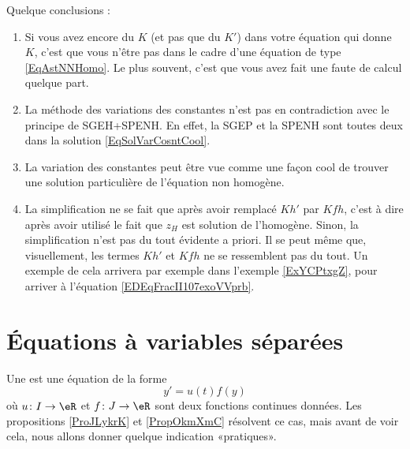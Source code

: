 Quelque conclusions :

\begin{enumerate}
\item
Si vous avez encore du $K$ (et pas que du $K'$) dans votre équation qui donne $K$, c'est que vous n'être pas dans le cadre d'une équation de type \eqref{EqAstNNHomo}. Le plus souvent, c'est que vous avez fait une faute de calcul quelque part.

\item
La méthode des variations des constantes n'est pas en contradiction avec le principe de \og SGEH+SPENH\fg. En effet, la SGEP et la SPENH sont toutes deux dans la solution \eqref{EqSolVarCosntCool}.

\item
La variation des constantes peut être vue comme une façon cool de trouver une solution particulière de l'équation non homogène.

\item
    La simplification ne se fait que après avoir remplacé $Kh'$ par $Kfh$, c'est à dire après avoir utilisé le fait que $z_H$ est solution de l'homogène. Sinon, la simplification n'est pas du tout évidente a priori. Il se peut même que, visuellement, les termes $Kh'$ et $Kfh$ ne se ressemblent pas du tout. Un exemple de cela arrivera par exemple dans l'exemple \ref{ExYCPtxgZ}, pour arriver à l'équation \eqref{EDEqFracII107exoVVprb}.

\end{enumerate}


\section{Équations à variables séparées}
\label{Secvarsep}

Une  est une équation  de la forme
\begin{equation}		\label{EqDiffSeparee}
	y'=u(t)f(y)
\end{equation}
où $u\colon I\to \eR$ et $f\colon J\to \eR$ sont deux fonctions continues données. Les propositions \ref{ProJLykrK} et \ref{PropOkmXmC} résolvent ce cas, mais avant de voir cela, nous allons donner quelque indication «pratiques».

